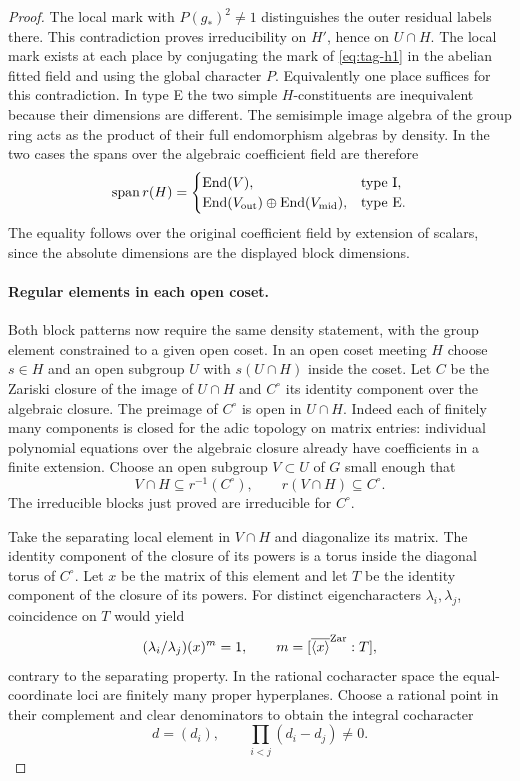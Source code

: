 \begin{proof}
The local
mark with \(P(g_*)^2\ne1\) distinguishes the outer residual labels
there. This contradiction proves irreducibility on \(H'\), hence on
\(U\cap H\). The local mark exists at each place by conjugating
the mark of \eqref{eq:tag-h1} in the abelian fitted field and using the
global character \(P\). Equivalently one place suffices for this
contradiction. In type E the two simple \(H\)-constituents are inequivalent
because their dimensions are different. The semisimple image
algebra of the group ring acts as the product of their full
endomorphism algebras by density. In the two cases the spans
over the algebraic coefficient field are therefore
\[
  \operatorname{span}r(H)=
   \begin{cases}
      \operatorname{End}(V),&\text{type I},\\
      \operatorname{End}(V_{\rm out})\oplus\operatorname{End}(V_{\rm mid}),
          &\text{type E}.
   \end{cases}
\]
The equality follows over the original coefficient field by
extension of scalars, since the absolute dimensions are the
displayed block dimensions.

\paragraph{Regular elements in each open coset.} Both block patterns now require the same density statement, with the group element
constrained to a given open coset. In an open coset meeting \(H\)
choose \(s\in H\) and an open subgroup \(U\) with
\(s(U\cap H)\) inside the coset. Let \(C\) be the Zariski closure
of the image of \(U\cap H\) and \(C^\circ\) its identity component
over the algebraic closure. The preimage of \(C^\circ\) is open in
\(U\cap H\). Indeed each of finitely many components is closed for
the adic topology on matrix entries: individual polynomial equations
over the algebraic closure already have coefficients in a finite
extension. Choose an open subgroup \(V\subset U\) of \(G\) small enough that 
\[
 V\cap H\subseteq r^{-1}(C^\circ),\qquad r(V\cap H)\subseteq C^\circ.
\]
 The irreducible blocks just proved
are irreducible for \(C^\circ\).

Take the separating local element in \(V\cap H\) and diagonalize its
matrix. The identity component of the closure of its powers is a
torus inside the diagonal torus of \(C^\circ\). Let \(x\) be the matrix of this element and let \(T\) be the identity component of the closure of its powers. For distinct eigencharacters \(\lambda_i,\lambda_j\), coincidence on \(T\) would yield 
\[
 (\lambda_i/\lambda_j)(x)^m=1,\qquad m=[\overline{\langle x\rangle}^{\rm Zar}:T],
\]
 contrary to the separating property. In the rational cocharacter space the equal-coordinate loci are finitely many proper hyperplanes. Choose a rational point in their complement and clear denominators to obtain the integral cocharacter
\[
 d=(d_i),\qquad \prod_{i<j}(d_i-d_j)\ne0 .
\]


\end{proof}
